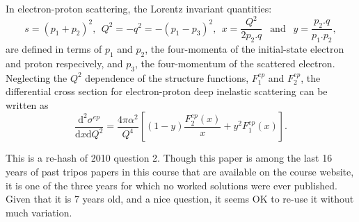 \documentclass[txfonts]{NSTexam}
\begin{document}
\begin{questions}
\begin{parts}
\end{parts}


\endanswer



\newpage

\question
\newcommand\fepone{F_1^{ep}}
\newcommand\feptwo{F_2^{ep}}
\newcommand\fenone{F_1^{en}}
\newcommand\fentwo{F_2^{en}}


\noindent In electron-proton scattering, the Lorentz invariant quantities:%
$$ s=(p_1+p_2)^2,\ \  Q^2=-q^2=-(p_1-p_3)^2, \ \ x=\frac{Q^2}{2 p_2 . q}\ \ \text{ and }\ \ y=\frac{p_2.q}{p_1.p_2},$$
are defined in terms of $p_1$ and $p_2$, the four-momenta of the initial-state electron and proton respecively, and $p_3$, the four-momentum of the scattered electron.  Neglecting the $Q^2$ dependence of the structure functions, $\fepone$ and $\feptwo$, the differential cross section for electron-proton deep inelastic scattering can be written as 
$$
\frac{\text{d}^2\sigma^{ep}}{\text{d}x\text{d}Q^2}
=
\frac{4\pi \alpha^2}{Q^4}\left[ { (1-y)\frac{\feptwo(x)}{x}+y^2 \fepone(x)}\right].
$$
\answer

This is a re-hash of 2010 question 2.  Though this paper is among the last 16 years of past tripos papers in this course that are available on the course website, it is one of the three years for which no worked solutions were ever published. Given that it is 7 years old, and a nice question, it seems OK to re-use it without much variation.
\endanswer



\end{questions}
\end{document}
